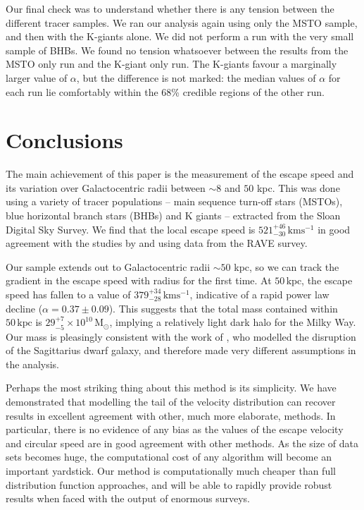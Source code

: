 \documentclass[useAMS,twocolumn,usenatbib]{mn2e}
\def\kpc{{\,\mathrm{kpc}}}
\def\kms{{\,\mathrm{kms^{-1}}}}
\def\Msun{{\,\mathrm{M}_\odot}}
\begin{document}
Our final check was to understand whether there is any tension between the different tracer samples. 
We ran our analysis again using only the MSTO sample, and then with the K-giants alone. 
We did not perform a run with the very small sample of BHBs. 
We found no tension whatsoever between the results from the MSTO only run and the K-giant only run. 
The K-giants favour a marginally larger value of $\alpha$, but the difference is not marked: the median values of $\alpha$ for each run lie comfortably within the 68\% credible regions of the other run.

\section{Conclusions}

The main achievement of this paper is the measurement of the escape speed and its variation over Galactocentric radii between $\sim 8$ and $50$ kpc.  
This was done using a variety of tracer populations -- main sequence turn-off stars (MSTOs), blue horizontal branch stars (BHBs) and K giants -- extracted from the Sloan Digital Sky Survey. 
We find that the local escape speed is $521^{+46}_{-30}\kms$ in good agreement with the studies by \cite{Sm07} and \cite{Pi14} using data from the RAVE survey.

Our sample extends out to Galactocentric radii $\sim 50$ kpc, so we can track the gradient in the escape speed with radius for the first time. 
At $50\kpc$, the escape speed has fallen to a value of $379^{+34}_{-28}\kms$, indicative of a rapid power law decline ($\alpha = 0.37\pm0.09$).
This suggests that the total mass contained within $50\kpc$ is $29^{+7}_{-5}\times10^{10}\Msun$, implying a relatively light dark halo for the Milky Way. 
Our mass is pleasingly consistent with the work of \citet{Gi14}, who modelled the disruption of the Sagittarius dwarf galaxy, and therefore made very different assumptions in the analysis.

Perhaps the most striking thing about this method is its simplicity. 
We have demonstrated that modelling the tail of the velocity distribution can recover results in excellent agreement with other, much more elaborate, methods. 
In particular, there is no evidence of any bias as the values of the escape velocity and circular speed are in good agreement with other methods.  
As the size of data sets becomes huge, the computational cost of any algorithm will become an important yardstick. 
Our method is computationally much cheaper than full distribution function approaches, and will be able to rapidly provide robust results when faced with the output of enormous surveys.
\end{document}
